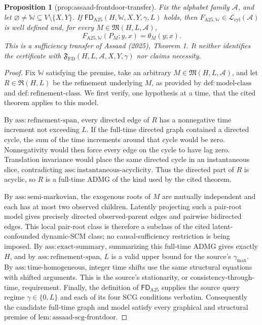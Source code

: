 \documentclass{article}
\newtheorem{proposition}{Proposition}
\begin{document}
\begin{proposition}[prop:assaad-frontdoor-transfer]\label{prop:assaad-frontdoor-transfer}
Fix the alphabet family \(\mathcal A\), and let \(\varnothing\ne\mathbb W\subseteq V\setminus\{X,Y\}\).  If \(\mathsf{FD}_{\mathrm{A25}}(H,\mathbb W,X,Y,\gamma,L)\) holds, then \(F_{\mathrm{A25},\mathbb W}\in\mathcal L_{\mathrm{cyl}}(\mathcal A)\) is well defined and, for every \(M\in\mathfrak M(H,L,\mathcal A)\),
\[
 F_{\mathrm{A25},\mathbb W}(P_M;y,x)=\theta_M(y;x).
\]
This is a sufficiency transfer of Assaad (2025), Theorem 1.  It neither identifies the certificate with \(\mathfrak F_{\mathrm{FD}}(H,L,\mathcal A,X,Y,\gamma)\) nor claims necessity.
\end{proposition}
\begin{proof}
Fix \(\mathbb W\) satisfying the premise, take an arbitrary \(M\in\mathfrak M(H,L,\mathcal A)\), and let \(R\in\mathfrak R(H,L)\) be the refinement underlying \(M\), as provided by \(\mathrm{def:model\text{-}class}\) and \(\mathrm{def:refinement\text{-}class}\).  We first verify, one hypothesis at a time, that the cited theorem applies to this model.

By \(\mathrm{ass:refinement\text{-}span}\), every directed edge of \(R\) has a nonnegative time increment not exceeding \(L\).  If the full-time directed graph contained a directed cycle, the sum of the time increments around that cycle would be zero.  Nonnegativity would then force every edge on the cycle to have lag zero.  Translation invariance would place the same directed cycle in an instantaneous slice, contradicting \(\mathrm{ass:instantaneous\text{-}acyclicity}\).  Thus the directed part of \(R\) is acyclic, so \(R\) is a full-time ADMG of the kind used by the cited theorem.

By \(\mathrm{ass:semi\text{-}markovian}\), the exogenous roots of \(M\) are mutually independent and each has at most two observed children.  Latently projecting such a pair-root model gives precisely directed observed-parent edges and pairwise bidirected edges.  This local pair-root class is therefore a subclass of the cited latent-confounded dynamic-SCM class; no causal-sufficiency restriction is being imposed.  By \(\mathrm{ass:exact\text{-}summary}\), summarizing this full-time ADMG gives exactly \(H\), and by \(\mathrm{ass:refinement\text{-}span}\), \(L\) is a valid upper bound for the source's \(\gamma_{\max}\).  By \(\mathrm{ass:time\text{-}homogeneous}\), integer time shifts use the same structural equations with shifted arguments.  This is the source's stationarity, or consistency-through-time, requirement.  Finally, the definition of \(\mathsf{FD}_{\mathrm{A25}}\) supplies the source query regime \(\gamma\in\{0,L\}\) and each of its four SCG conditions verbatim.  Consequently the candidate full-time graph and model satisfy every graphical and structural premise of \(\mathrm{lem:assaad\text{-}scg\text{-}frontdoor}\).


\end{proof}
\end{document}
